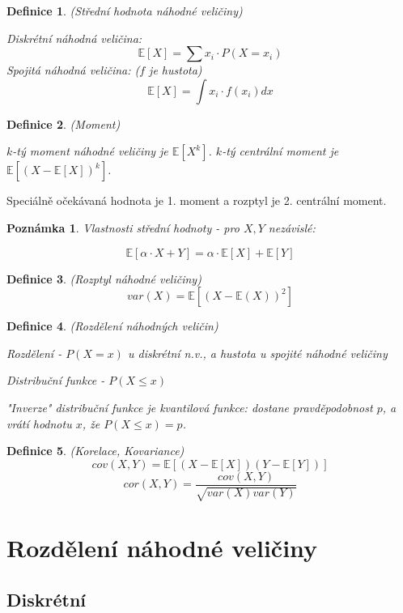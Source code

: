 \documentclass[a4paper,10pt,titlepage]{article} \usepackage[utf8]{inputenc}
\newtheorem{define}{Definice}
\newtheorem*{remark}{Poznámka}
\begin{document}
\begin{define}
(Střední hodnota náhodné veličiny)

Diskrétní náhodná veličina:
\[
	\mathbb{E}[X] = \sum x_i \cdot P(X = x_i)
\]
Spojitá náhodná veličina: ($f$ je hustota)
\[
	\mathbb{E}[X] = \int x_i \cdot f(x_i) dx
\]
\end{define}

\begin{define}
(Moment)

$k$-tý moment náhodné veličiny je $\mathbb{E}[X^k]$.
$k$-tý centrální moment je $\mathbb{E}[(X-\mathbb{E}[X])^k]$.
\end{define}

Speciálně očekávaná hodnota je 1. moment a rozptyl je 2. centrální moment.

\begin{remark}
Vlastnosti střední hodnoty - pro $X,Y$ nezávislé:

\[
\mathbb{E}[\alpha \cdot X + Y] = \alpha \cdot \mathbb{E}[X] + \mathbb{E}[Y]
\]
\end{remark}

\begin{define}
(Rozptyl náhodné veličiny)
\[
	var(X) = \mathbb{E}[(X - \mathbb{E} (X))^2]
\]
\end{define}

\begin{define}
(Rozdělení náhodných veličin)

Rozdělení - $P(X = x)$ u diskrétní n.v., a hustota u spojité náhodné veličiny

Distribuční funkce - $P(X \leq x)$

"Inverze" distribuční funkce je kvantilová funkce: dostane pravděpodobnost $p$,
a vrátí hodnotu $x$, že $P(X\leq x)=p$.

\end{define}

\begin{define}
(Korelace, Kovariance)
\[
cov(X,Y) = \mathbb{E}[(X-\mathbb{E}[X])(Y-\mathbb{E}[Y])]
\]
\[
cor(X,Y) = \frac{cov(X,Y)}{\sqrt{var(X)var(Y)}}
\]
\end{define}

\section{Rozdělení náhodné veličiny}

\subsection{Diskrétní}
\end{document}
